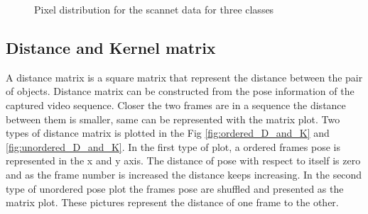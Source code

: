    	\begin{figure}%
    	\centering
    	\qquad
    	\caption{Pixel distribution for the scannet data for three classes}%
    	\label{fig:scannet_three_classes}%
    \end{figure}
    \subsection{Distance and Kernel matrix}
	
	A distance matrix is a square matrix that represent the distance between the pair of objects. Distance matrix can be constructed from the pose information of the captured video sequence. Closer the two frames are in a sequence the distance between them is smaller, same can be represented with the matrix plot. Two types of distance matrix is plotted in the Fig \ref{fig:ordered_D_and_K} and \ref{fig:unordered_D_and_K}. In the first type of plot, a ordered frames pose is represented in the x and y axis. The distance of pose with respect to itself is zero and as the frame number is increased the distance keeps increasing. In the second type of unordered pose plot the frames pose are shuffled and presented as the matrix plot. These pictures represent the distance of one frame to the other. 
	
